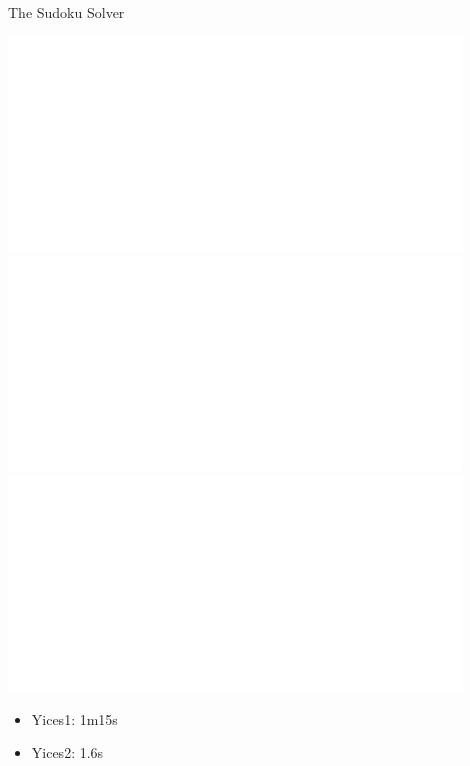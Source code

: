 \documentclass{beamer}
\begin{document}
\begin{frame}{The Sudoku Solver}
\begin{overprint}
 \includegraphics[width=0.9\textwidth]{main1}
 \includegraphics[width=0.9\textwidth]{main2}
 \includegraphics[width=0.9\textwidth]{main3}
\end{overprint}
\begin{itemize}
\item Yices1: 1m15s
\item Yices2: 1.6s
\end{itemize}
\end{frame}
\end{document}
